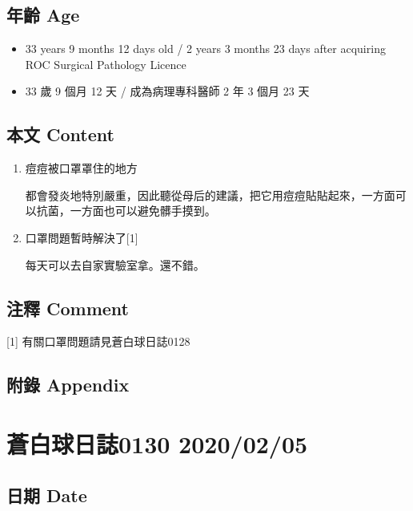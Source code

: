 \documentclass[a5paper, 12pt
]{book}
\providecommand{\tightlist}{%
  \setlength{\itemsep}{0pt}\setlength{\parskip}{0pt}}
\begin{document}
\hypertarget{ux5e74ux9f61-age-65}{%
\subsection{年齡 Age}\label{ux5e74ux9f61-age-65}}

\begin{itemize}
\tightlist
\item
  33 years 9 months 12 days old / 2 years 3 months 23 days after
  acquiring ROC Surgical Pathology Licence
\item
  33 歲 9 個月 12 天 / 成為病理專科醫師 2 年 3 個月 23 天
\end{itemize}

\hypertarget{ux672cux6587-content-65}{%
\subsection{本文 Content}\label{ux672cux6587-content-65}}

\begin{enumerate}
\def\labelenumi{\arabic{enumi}.}
\item
  痘痘被口罩罩住的地方

  都會發炎地特別嚴重，因此聽從母后的建議，把它用痘痘貼貼起來，一方面可以抗菌，一方面也可以避免髒手摸到。
\item
  口罩問題暫時解決了{[}1{]}

  每天可以去自家實驗室拿。還不錯。
\end{enumerate}

\hypertarget{ux6ce8ux91cb-comment-64}{%
\subsection{注釋 Comment}\label{ux6ce8ux91cb-comment-64}}

{[}1{]} 有關口罩問題請見蒼白球日誌0128

\hypertarget{ux9644ux9304-appendix-65}{%
\subsection{附錄 Appendix}\label{ux9644ux9304-appendix-65}}

\hypertarget{ux84bcux767dux7403ux65e5ux8a8c0130-20200205}{%
\section{蒼白球日誌0130
2020/02/05}\label{ux84bcux767dux7403ux65e5ux8a8c0130-20200205}}

\hypertarget{ux65e5ux671f-date-66}{%
\subsection{日期 Date}\label{ux65e5ux671f-date-66}}
\end{document}
